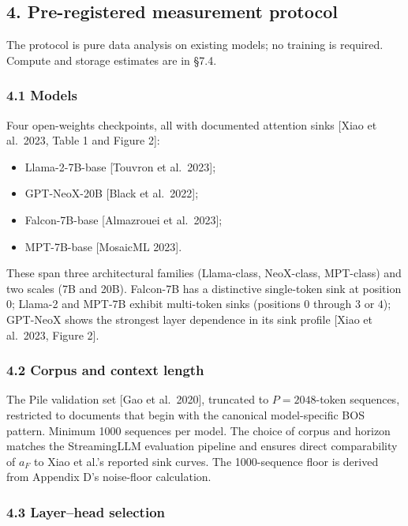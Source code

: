 \documentclass[
  letterpaper,
  11pt]{article}
\providecommand{\tightlist}{%
  \setlength{\itemsep}{0pt}\setlength{\parskip}{0pt}}
\theoremstyle{plain}
\theoremstyle{definition}
\theoremstyle{remark}
\begin{document}
\subsection{4. Pre-registered measurement protocol}\label{pre-registered-measurement-protocol}

The protocol is pure data analysis on existing models; no training is required. Compute and storage estimates are in §7.4.

\subsubsection{4.1 Models}\label{models}

Four open-weights checkpoints, all with documented attention sinks {[}Xiao et al.~2023, Table 1 and Figure 2{]}:

\begin{itemize}
\tightlist
\item
  Llama-2-7B-base {[}Touvron et al.~2023{]};
\item
  GPT-NeoX-20B {[}Black et al.~2022{]};
\item
  Falcon-7B-base {[}Almazrouei et al.~2023{]};
\item
  MPT-7B-base {[}MosaicML 2023{]}.
\end{itemize}

These span three architectural families (Llama-class, NeoX-class, MPT-class) and two scales (7B and 20B). Falcon-7B has a distinctive single-token sink at position \(0\); Llama-2 and MPT-7B exhibit multi-token sinks (positions \(0\) through \(3\) or \(4\)); GPT-NeoX shows the strongest layer dependence in its sink profile {[}Xiao et al.~2023, Figure 2{]}.

\subsubsection{4.2 Corpus and context length}\label{corpus-and-context-length}

The Pile validation set {[}Gao et al.~2020{]}, truncated to \(P = 2048\)-token sequences, restricted to documents that begin with the canonical model-specific BOS pattern. Minimum 1000 sequences per model. The choice of corpus and horizon matches the StreamingLLM evaluation pipeline and ensures direct comparability of \(a_F\) to Xiao et al.'s reported sink curves. The 1000-sequence floor is derived from Appendix D's noise-floor calculation.

\subsubsection{4.3 Layer--head selection}\label{layerhead-selection}
\end{document}
